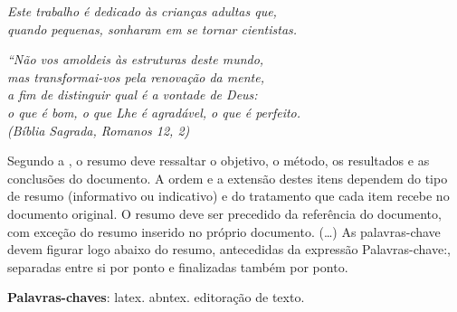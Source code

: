 \documentclass[
	12pt,				%
	openright,			%
	a4paper,			%
	fleqn, %
	english,			%
	french,				%
	spanish,			%
	brazil,				%
	]{abntex2}
\begin{document}
\frenchspacing 


\imprimircapa

\imprimirfolhaderosto*

\imprimirfolhabanca

\begin{dedicatoria}
    \vspace*{\fill}
	\begin{flushright}
       \textit{ Este trabalho é dedicado às crianças adultas que,\\
       quando pequenas, sonharam em se tornar cientistas.}
	\end{flushright}
\end{dedicatoria}

\begin{epigrafe}
    \vspace*{\fill}
	\begin{flushright}
		\textit{``Não vos amoldeis às estruturas deste mundo, \\
		mas transformai-vos pela renovação da mente, \\
		a fim de distinguir qual é a vontade de Deus: \\
		o que é bom, o que Lhe é agradável, o que é perfeito.\\
		(Bíblia Sagrada, Romanos 12, 2)}
	\end{flushright}
\end{epigrafe}

\begin{agradecimentos}
\lipsum[2-3]
\end{agradecimentos}


\begin{resumo}
\noindent
Segundo a , o resumo deve ressaltar o
 objetivo, o método, os resultados e as conclusões do documento. A ordem e a extensão
 destes itens dependem do tipo de resumo (informativo ou indicativo) e do
 tratamento que cada item recebe no documento original. O resumo deve ser
 precedido da referência do documento, com exceção do resumo inserido no
 próprio documento. (\ldots) As palavras-chave devem figurar logo abaixo do
 resumo, antecedidas da expressão Palavras-chave:, separadas entre si por
 ponto e finalizadas também por ponto.

\vspace{\onelineskip}
    
\noindent
\textbf{Palavras-chaves}: latex. abntex. editoração de texto.
\end{resumo}
\end{document}
